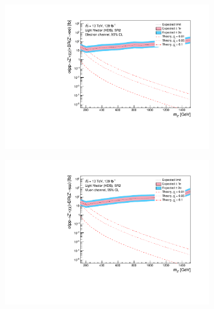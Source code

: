 \documentclass[12pt, a4paper]{book}
\begin{document}
\begin{figure}[!ht]
\begin{subfigure}[b]{0.49\textwidth}
   \end{subfigure}
   \hfill
   \begin{subfigure}[b]{0.49\textwidth}
      \centering
      \includegraphics[width=1\textwidth]{Limits/Model_independent/100-150/LV_HDS/mass_exclusion_ee.pdf}
   \end{subfigure}
   \hfill
   \begin{subfigure}[b]{0.49\textwidth}
      \centering
      \includegraphics[width=1\textwidth]{Limits/Model_independent/100-150/LV_HDS/mass_exclusion_uu.pdf}
   \end{subfigure}
   \hfill
	\begin{subfigure}[b]{0.49\textwidth}
      \centering

\end{subfigure}
\end{figure}
\end{document}
